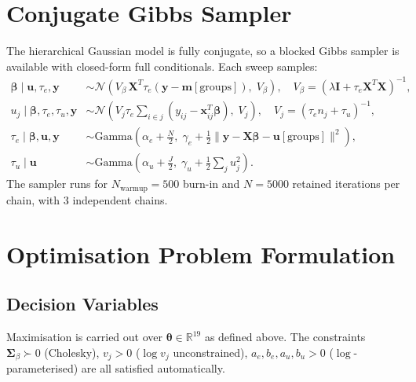 \documentclass[11pt,a4paper]{article}
\newcommand{\R}{\mathbb{R}}
\begin{document}
\section{Conjugate Gibbs Sampler}

The hierarchical Gaussian model is fully conjugate, so a blocked Gibbs sampler is
available with closed-form full conditionals.
Each sweep samples:
\begin{align}
  \bm{\beta} \mid \mathbf{u}, \tau_e, \mathbf{y}
    &\sim \mathcal{N}(V_\beta\,\bm{X}^T\tau_e(\mathbf{y}-\bm{m}[\mathrm{groups}]),\; V_\beta),
    \quad V_\beta = (\lambda\bm{I} + \tau_e\bm{X}^T\bm{X})^{-1},\\
  u_j \mid \bm{\beta}, \tau_e, \tau_u, \mathbf{y}
    &\sim \mathcal{N}(V_j\tau_e\!\sum_{i\in j}(y_{ij} - \mathbf{x}_{ij}^T\bm{\beta}),\; V_j),
    \quad V_j = (\tau_e n_j + \tau_u)^{-1},\\
  \tau_e \mid \bm{\beta}, \mathbf{u}, \mathbf{y}
    &\sim \mathrm{Gamma}\!\left(\alpha_e + \tfrac{N}{2},\;
      \gamma_e + \tfrac{1}{2}\|\mathbf{y}-\bm{X}\bm{\beta}-\mathbf{u}[\mathrm{groups}]\|^2\right),\\
  \tau_u \mid \mathbf{u}
    &\sim \mathrm{Gamma}\!\left(\alpha_u + \tfrac{J}{2},\;
      \gamma_u + \tfrac{1}{2}\sum_j u_j^2\right).
\end{align}
The sampler runs for $N_{\mathrm{warmup}} = 500$ burn-in and $N = 5000$ retained
iterations per chain, with 3 independent chains.

\section{Optimisation Problem Formulation}

\subsection*{Decision Variables}

Maximisation is carried out over $\bm{\theta} \in \R^{19}$ as defined above.
The constraints $\bm{\Sigma}_\beta \succ 0$ (Cholesky), $v_j > 0$ ($\log v_j$
unconstrained), $a_e, b_e, a_u, b_u > 0$ ($\log$-parameterised) are all
satisfied automatically.
\end{document}
